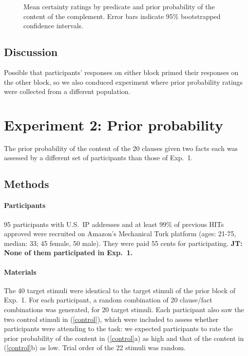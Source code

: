 \documentclass[11pt,fleqn]{article}
\newcommand{\6}{\mbox{$[\hspace*{-.6mm}[$}}
\newcommand{\9}{\mbox{$]\hspace*{-.6mm}]$}}
\newcommand{\jt}[1]{\textbf{\color{blue}JT: #1}}
\begin{document}
\begin{figure}[H]
\centering


\caption{Mean certainty ratings by predicate and prior probability of the content of the complement. Error bars indicate 95\% bootstrapped confidence intervals.} 
\label{f-projection}
\end{figure}

\subsection{Discussion}

Possible that participants' responses on either block primed their responses on the other block, so we also conduced experiment where prior probability ratings were collected from a different population.

\section{Experiment 2: Prior probability}

The prior probability of the content of the 20 clauses given two facts each was assessed by a different set of participants than those of Exp.~1.

\subsection{Methods}

\paragraph{Participants} 95 participants with U.S.\ IP addresses and at least 99\% of previous HITs approved were recruited on Amazon's Mechanical Turk platform (ages: 21-75, median: 33; 45 female, 50 male). They were paid 55 cents for participating. \jt{None of them participated in Exp.~1.}

\paragraph{Materials} The 40 target stimuli were identical to the target stimuli of the prior block of Exp.~1. For each participant, a random combination of 20 clause/fact combinations was generated, for 20 target stimuli. Each participant also saw the two control stimuli in (\ref{control}), which were included to assess whether participants were attending to the task: we expected participants to rate the prior probability of the content in (\ref{control}a) as high and that of the content in (\ref{control}b) as low. Trial order of the 22 stimuli was random.
\end{document}
